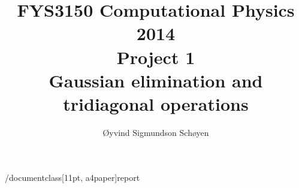/documentclass[11pt, a4paper]{report}

\usepackage[T1]{fontenc}
\usepackage[utf8]{inputenc}
\usepackage[norsk]{babel}
\usepackage{amsmath}
\usepackage{amsfonts}
\usepackage{graphicx}

\pagestyle{empty}

\title{\normalsize FYS3150 Computational Physics 2014\\
\vspace{10mm}
\huge Project 1\\
\vspace{10mm}
\normalsize {\bf Gaussian elimination and tridiagonal operations}}

\author{Øyvind Sigmundson Schøyen}



\maketitle



